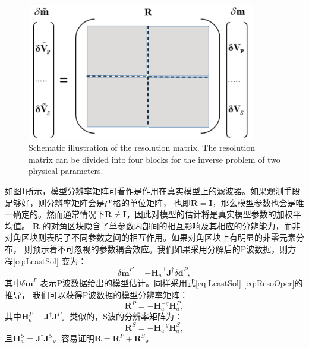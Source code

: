 \begin{figure}
    \begin{center}
        \includegraphics[width=10cm]{Figure/chapter02/ResoOpera/Fig/resolutionmatrix.pdf}
        \caption{
Schematic illustration of the resolution matrix.
The resolution matrix can be divided into four blocks for the inverse problem of two physical parameters.
    }
    \label{fig:IllustrReso}
    \end{center}
\end{figure}
如图\ref{fig:IllustrReso}所示，模型分辨率矩阵可看作是作用在真实模型上的滤波器。如果观测手段足够好，则分辨率矩阵会是严格的单位矩阵，
也即$\mathbf{R}=\mathbf{I}$，那么模型参数也会是唯一确定的。然而通常情况下$\mathbf{R} \ne \mathbf{I}$，因此对模型的估计将是真实模型参数的加权平均值。
$\mathbf{R}$ 的对角区块隐含了单参数内部间的相互影响及其相应的分辨能力，而非对角区块则表明了不同参数之间的相互作用。如果对角区块上有明显的非零元素分布，
则预示着不可忽视的参数耦合效应。我们如果采用分解后的P波数据，则方程\eqref{eq:LeastSol} 变为：
\begin{equation}
        \delta \mathbf{\tilde{m}}^P=-\mathbf{H}^{-1}_a\mathbf{J}^{\dagger}\delta \mathbf{d}^P,
        \label{eq:LeastSolP}
\end{equation}
其中$\delta \mathbf{\tilde{m}}^P$ 表示P波数据给出的模型估计。同样采用式\eqref{eq:LeastSol}-\eqref{eq:ResoOper}的推导，
我们可以获得P波数据的模型分辨率矩阵：
\begin{equation}
        \mathbf{R}^P=-\mathbf{H}^{-g}_a\mathbf{H}_a^P,
        \label{eq:ResoOperP}
\end{equation}
其中$\mathbf{H}_a^P=\mathbf{J}^{\dagger}\mathbf{J}^P$。类似的，S波的分辨率矩阵为：
\begin{equation}
        \mathbf{R}^S=-\mathbf{H}^{-g}_a\mathbf{H}_a^S,
        \label{eq:ResoOperS}
\end{equation}
且$\mathbf{H}_a^S=\mathbf{J}^{\dagger}\mathbf{J}^S$。容易证明$\mathbf{R}=\mathbf{R}^P+\mathbf{R}^S$。

